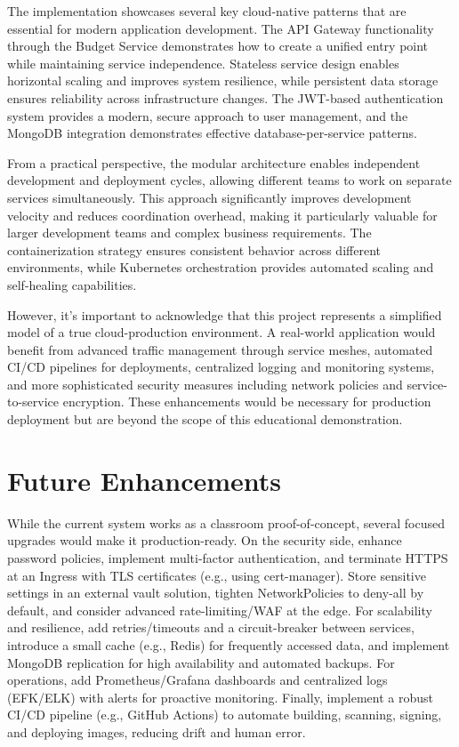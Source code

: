 \documentclass[conference]{IEEEtran}
\begin{document}
The implementation showcases several key cloud-native patterns that are essential for modern application development. The API Gateway functionality through the Budget Service demonstrates how to create a unified entry point while maintaining service independence. Stateless service design enables horizontal scaling and improves system resilience, while persistent data storage ensures reliability across infrastructure changes. The JWT-based authentication system provides a modern, secure approach to user management, and the MongoDB integration demonstrates effective database-per-service patterns.

From a practical perspective, the modular architecture enables independent development and deployment cycles, allowing different teams to work on separate services simultaneously. This approach significantly improves development velocity and reduces coordination overhead, making it particularly valuable for larger development teams and complex business requirements. The containerization strategy ensures consistent behavior across different environments, while Kubernetes orchestration provides automated scaling and self-healing capabilities.

However, it's important to acknowledge that this project represents a simplified model of a true cloud-production environment. A real-world application would benefit from advanced traffic management through service meshes, automated CI/CD pipelines for deployments, centralized logging and monitoring systems, and more sophisticated security measures including network policies and service-to-service encryption. These enhancements would be necessary for production deployment but are beyond the scope of this educational demonstration.

\section{\textbf{Future Enhancements}}
While the current system works as a classroom proof-of-concept, several focused upgrades would make it production-ready. On the security side, enhance password policies, implement multi-factor authentication, and terminate HTTPS at an Ingress with TLS certificates (e.g., using cert-manager). Store sensitive settings in an external vault solution, tighten NetworkPolicies to deny-all by default, and consider advanced rate-limiting/WAF at the edge. For scalability and resilience, add retries/timeouts and a circuit-breaker between services, introduce a small cache (e.g., Redis) for frequently accessed data, and implement MongoDB replication for high availability and automated backups. For operations, add Prometheus/Grafana dashboards and centralized logs (EFK/ELK) with alerts for proactive monitoring. Finally, implement a robust CI/CD pipeline (e.g., GitHub Actions) to automate building, scanning, signing, and deploying images, reducing drift and human error.
\end{document}
